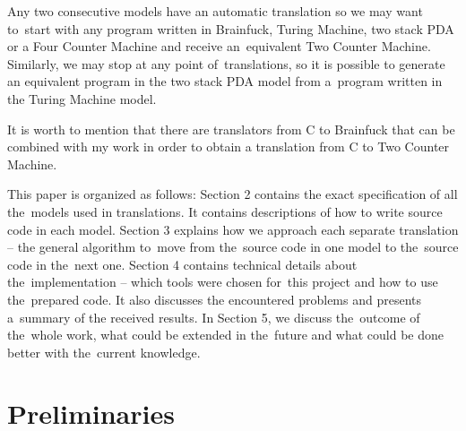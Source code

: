 \documentclass[english,shortabstract,mgr]{iithesis}
\begin{document}
\begin{center}
\end{center}

Any two consecutive models have an automatic translation so we may want to~start with any program written
in Brainfuck, Turing Machine, two stack PDA or a Four Counter Machine and receive an~equivalent Two Counter Machine.
Similarly, we may stop at any point of~translations, so it is possible to generate an equivalent program
in the two stack PDA model from a~program written in the Turing Machine model.

It is worth to mention that there are translators from C to Brainfuck that can
be combined with my work in order to obtain a translation from C to Two Counter
Machine.

This paper is organized as follows: Section 2 contains the exact specification
of all the~models used in translations.
It contains descriptions of how to write source code in each model. Section 3
explains how we approach each separate translation -- the general algorithm
to~move from the~source code in one model
to the~source code in the~next one. Section 4 contains technical details about
the~implementation -- which tools
were chosen for~this project and how to use the~prepared code. It also
discusses the encountered problems and presents
a~summary of the received results. In Section 5, we discuss the~outcome
of the~whole work, what could be extended in the~future
and what could be done better with the~current knowledge.


\chapter {Preliminaries}
\end{document}
